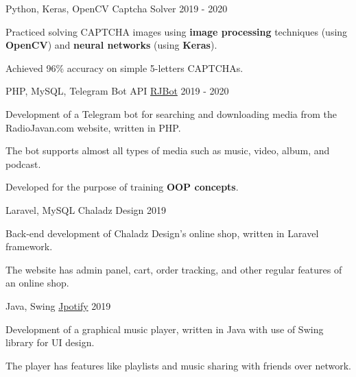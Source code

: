 \begin{cventries}
  \cventry
    {Python, Keras, OpenCV} %
    {Captcha Solver} %
    {} %
    {2019 - 2020} %
    {
      \begin{cvitems} %
      	\item {Practiced solving CAPTCHA images using \textbf{image processing} techniques (using \textbf{OpenCV}) and \textbf{neural networks} (using \textbf{Keras}).}
      	\item {Achieved 96\% accuracy on simple 5-letters CAPTCHAs.}
      \end{cvitems}
    }

  \cventry
    {PHP, MySQL, Telegram Bot API} %
    {\href{https://github.com/radinshayanfar/RJBot}{RJBot}} %
    {} %
    {2019 - 2020} %
    {
      \begin{cvitems} %
        \item {Development of a Telegram bot for searching and downloading media from the RadioJavan.com website, written in PHP.}
		    \item {The bot supports almost all types of media such as music, video, album, and podcast.}
		    \item {Developed for the purpose of training \textbf{OOP concepts}.}
      \end{cvitems}
    }

  \cventry
    {Laravel, MySQL} %
    {Chaladz Design} %
    {} %
    {2019} %
    {
      \begin{cvitems} %
        \item {Back-end development of Chaladz Design's online shop, written in Laravel framework.} %
		\item {The website has admin panel, cart, order tracking, and other regular features of an online shop.}
      \end{cvitems}
    }

  \cventry
    {Java, Swing} %
    {\href{https://github.com/radinshayanfar/Jpotify}{Jpotify}} %
    {} %
    {2019} %
    {
      \begin{cvitems} %
        \item {Development of a graphical music player, written in Java with use of Swing library for UI design.}
		\item {The player has features like playlists and music sharing with friends over network.}
      \end{cvitems}
    }


\end{cventries}
